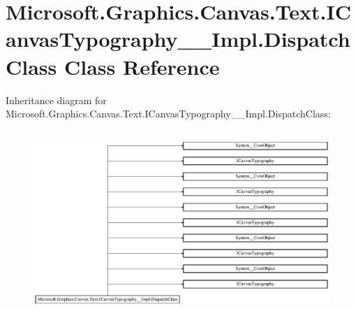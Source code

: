\hypertarget{class_microsoft_1_1_graphics_1_1_canvas_1_1_text_1_1_i_canvas_typography_____impl_1_1_dispatch_class}{}\section{Microsoft.\+Graphics.\+Canvas.\+Text.\+I\+Canvas\+Typography\+\_\+\+\_\+\+Impl.\+Dispatch\+Class Class Reference}
\label{class_microsoft_1_1_graphics_1_1_canvas_1_1_text_1_1_i_canvas_typography_____impl_1_1_dispatch_class}
Inheritance diagram for Microsoft.\+Graphics.\+Canvas.\+Text.\+I\+Canvas\+Typography\+\_\+\+\_\+\+Impl.\+Dispatch\+Class\+:\begin{figure}[H]
\begin{center}
\leavevmode
\includegraphics[height=7.000000cm]{class_microsoft_1_1_graphics_1_1_canvas_1_1_text_1_1_i_canvas_typography_____impl_1_1_dispatch_class}
\end{center}
\end{figure}
